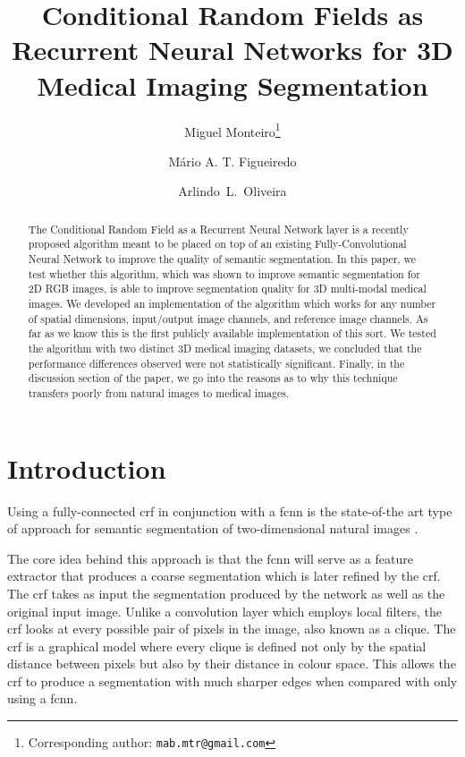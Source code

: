 \documentclass{article}
\title{Conditional Random Fields as Recurrent Neural Networks for 3D Medical Imaging Segmentation}
\author[1]{Miguel Monteiro\thanks{Corresponding author: \texttt{mab.mtr@gmail.com} }}
\author[2,3]{Mário A. T. Figueiredo}
\author[1,2]{Arlindo~L.~Oliveira}
\affil[1]{INESC-ID}
\affil[2]{Instituto Superior Técnico, Universidade de Lisboa}
\affil[3]{Instituto de Telecomunicações}
\date{}
\begin{document}
\maketitle

\begin{abstract}
    \noindent The Conditional Random Field as a Recurrent Neural Network layer is a recently proposed algorithm meant to be placed on top of an existing Fully-Convolutional Neural Network to improve the quality of semantic segmentation.
    In this paper, we test whether this algorithm, which was shown to improve semantic segmentation for 2D RGB images, is able to improve segmentation quality for 3D multi-modal medical images.
    We developed an implementation of the algorithm which works for any number of spatial dimensions, input/output image channels, and reference image channels. 
    As far as we know this is the first publicly available implementation of this sort.
    We tested the algorithm with two distinct 3D medical imaging datasets, we concluded that the performance differences observed were not statistically significant.
    Finally, in the discussion section of the paper, we go into the reasons as to why this technique transfers poorly from natural images to medical images.  
\end{abstract}

\section{Introduction}

Using a fully-connected \gls{crf} \cite{FullyConnectedCRF} in conjunction with a \gls{fcnn} \cite{long2015fully} is the state-of-the art type of approach for semantic segmentation of two-dimensional natural images \cite{DeepLab}.

The core idea behind this approach is that the \gls{fcnn} will serve as a feature extractor that produces a coarse segmentation which is later refined by the \gls{crf}.
The \gls{crf} takes as input the segmentation produced by the network as well as the original input image.
Unlike a convolution layer which employs local filters, the \gls{crf} looks at every possible pair of pixels in the image, also known as a clique.
The \gls{crf} is a graphical model where every clique is defined not only by the spatial distance between pixels but also by their distance in colour space.
This allows the \gls{crf} to produce a segmentation with much sharper edges when compared with only using a \gls{fcnn}.
\end{document}
